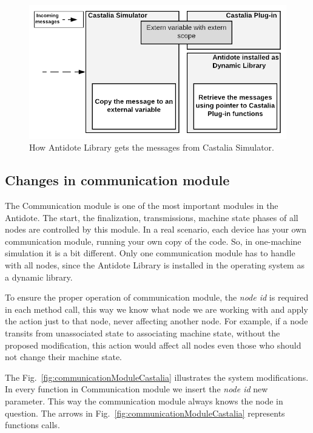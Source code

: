 \begin{figure}[htbp]
\centerline{\includegraphics[scale=0.35]{figures/castaliaPlugin.png}}
\caption{How Antidote Library gets the messages from Castalia Simulator.}
\label{fig:CastaliaPlugin}
\end{figure}

\subsection{Changes in communication module}

The Communication module is one of the most important modules in the Antidote. The start, the finalization, transmissions, machine state phases of all nodes are controlled by this module. In a real scenario, each device has your own communication module, running your own copy of the code. So, in one-machine simulation it is a bit different. Only one communication module has to handle with all nodes, since the Antidote Library is installed in the operating system as a dynamic library.

To ensure the proper operation of communication module, the \textit{node id} is required in each method call, this way we know what node we are working with and apply the action just to that node, never affecting another node. For example, if a node transits from unassociated state to associating machine state, without the proposed modification, this action would affect all nodes even those who should not change their machine state.

The Fig.~\ref{fig:communicationModuleCastalia} illustrates the system modifications. In every function in Communication module we insert the \textit{node id} new parameter. This way the communication module always knows the node in question. The arrows in Fig.~\ref{fig:communicationModuleCastalia} represents functions calls.

